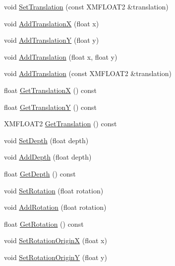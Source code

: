 \begin{DoxyCompactItemize}
\item 
void \hyperlink{structmage_1_1_sprite_transform_a65a6ccde86d9697dd9568e49f709570a}{Set\+Translation} (const X\+M\+F\+L\+O\+A\+T2 \&translation)
\item 
void \hyperlink{structmage_1_1_sprite_transform_a19726f8905e837126c0d566c7e68ea3c}{Add\+TranslationX} (float x)
\item 
void \hyperlink{structmage_1_1_sprite_transform_ad3d94aefc790ec25ba67563fbc8b8dab}{Add\+TranslationY} (float y)
\item 
void \hyperlink{structmage_1_1_sprite_transform_a093c1586c22ee8a12d91d897978bc03f}{Add\+Translation} (float x, float y)
\item 
void \hyperlink{structmage_1_1_sprite_transform_a19f756cd4e9d52621c420fe32be20bba}{Add\+Translation} (const X\+M\+F\+L\+O\+A\+T2 \&translation)
\item 
float \hyperlink{structmage_1_1_sprite_transform_ab33e1ff3c03940072538fe4a6b746f10}{Get\+TranslationX} () const
\item 
float \hyperlink{structmage_1_1_sprite_transform_a7cf25b0261f0fd65339a9c3e119e2573}{Get\+TranslationY} () const
\item 
X\+M\+F\+L\+O\+A\+T2 \hyperlink{structmage_1_1_sprite_transform_a93170905081d8a7a225d251eda8c6837}{Get\+Translation} () const
\item 
void \hyperlink{structmage_1_1_sprite_transform_a25096a75c5b2fbb08b771b14567cc16e}{Set\+Depth} (float depth)
\item 
void \hyperlink{structmage_1_1_sprite_transform_a9865d77d9c2e02758b1466423c12bcc2}{Add\+Depth} (float depth)
\item 
float \hyperlink{structmage_1_1_sprite_transform_a9dfb5844abddaf3648f887f21db7077d}{Get\+Depth} () const
\item 
void \hyperlink{structmage_1_1_sprite_transform_a23921afd58b631f297328cf2b34d5c40}{Set\+Rotation} (float rotation)
\item 
void \hyperlink{structmage_1_1_sprite_transform_a0a24823966ff906791ae598ac4248d03}{Add\+Rotation} (float rotation)
\item 
float \hyperlink{structmage_1_1_sprite_transform_a1dda0fe10496d0d04a660c84d9a87efe}{Get\+Rotation} () const
\item 
void \hyperlink{structmage_1_1_sprite_transform_a8b41bee9010d31027b2c1c40b393a4f5}{Set\+Rotation\+OriginX} (float x)
\item 
void \hyperlink{structmage_1_1_sprite_transform_affd054e4f5602930b84a21b1637b657a}{Set\+Rotation\+OriginY} (float y)

\end{DoxyCompactItemize}
